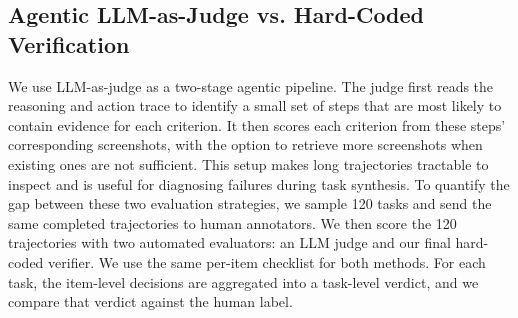 \documentclass{llmxive}
\begin{document}
\subsection{Agentic LLM-as-Judge vs. Hard-Coded Verification}
\label{sec:llm-as-judge-comparison}
We use LLM-as-judge as a two-stage agentic pipeline. The judge first reads the
reasoning and action trace to identify a small set of steps that are most
likely to contain evidence for each criterion. It then scores each criterion
from these steps' corresponding screenshots, with the option to retrieve more screenshots when existing ones are not sufficient. This setup makes long trajectories tractable to
inspect and is useful for diagnosing failures during task synthesis.
To quantify the gap between these two evaluation strategies, we sample 120
tasks and send the same completed trajectories to human annotators. We then
score the 120 trajectories with two automated evaluators: an LLM judge and our
final hard-coded verifier. We use the same per-item checklist for both methods.
For each task, the item-level decisions are aggregated into a task-level
verdict, and we compare that verdict against the human label. 
\end{document}
